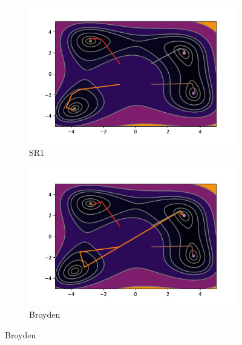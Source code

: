 \begin{figure}[h!]
    \begin{subfigure}{0.5\textwidth}
        \includegraphics[width=\textwidth, trim=1.4cm 0.5cm 1.3cm 1cm, clip]{assets/SR1/himmelblau.pdf}
        \caption{SR1}
    \end{subfigure}
    \begin{subfigure}{0.5\textwidth}
        \includegraphics[width=\textwidth, trim=1.4cm 0.5cm 1.3cm 1cm, clip]{assets/Broyden/himmelblau.pdf}
        \caption{Broyden}
    \end{subfigure}
\end{figure}
